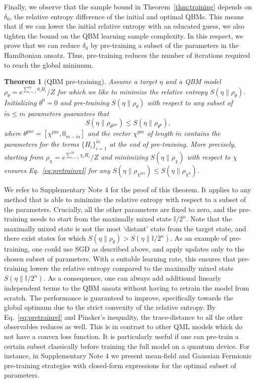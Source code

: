 \documentclass[
    reprint,
    aps,
    prx,
    longbibliography
]{revtex4-2}
\newtheorem{theorem}{Theorem}
\begin{document}
Finally, we observe that the sample bound in Theorem~\ref{thm:training} depends on $\delta_0$, the relative entropy difference of the initial and optimal QBMs. This means that if we can lower the initial relative entropy with an educated guess, we also tighten the bound on the QBM learning sample complexity. In this respect, we prove that we can reduce $\delta_0$ by pre-training a subset of the parameters in the Hamiltonian ansatz. Thus, pre-training reduces the number of iterations required to reach the global minimum.

\begin{theorem}[QBM pre-training]
\label{thm:pretraining}
    Assume a target $\eta$ and a QBM model $\rho_\theta=e^{\sum_{i=1}^m \theta_i H_i}/Z$ for which we like to minimize the relative entropy $S(\eta \|\rho_\theta)$. Initializing $\theta^0=0$ and pre-training $S(\eta\| \rho_\theta)$ with respect to any subset of $\tilde{m} \leq m $ parameters guarantees that \begin{equation}\label{eq:pretrainrel}
         S(\eta \|\rho_{\theta^\mathrm{pre}}) \leq S(\eta \|\rho_{\theta^0}), 
    \end{equation} where $\theta^\mathrm{pre} = [\chi^{\mathrm{pre}}, 0_{m-\tilde{m}}]$ and the vector $\chi^{\mathrm{pre}}$ of length $\tilde{m}$ contains the parameters for the terms $\{H_i\}_{i=1}^{\tilde{m}}$ at the end of pre-training.
    More precisely, starting from $\rho_\chi=e^{\sum_{i=1}^{\tilde{m}} \chi_i H_i}/Z$ and minimizing $S(\eta \|\rho_\chi)$ with respect to $\chi$ ensures Eq.~\eqref{eq:pretrainrel} for any $S(\eta \|\rho_{\chi^{\mathrm{pre}}})\leq S(\eta \|\rho_{\chi^0})$.
\end{theorem}

We refer to Supplementary Note 4 for the proof of this theorem. It applies to any method that is able to minimize the relative entropy with respect to a subset of the parameters. Crucially, all the other parameters are fixed to zero, and the pre-training needs to start from the maximally mixed state $\mathbb{I}/2^n$. Note that the maximally mixed state is not the most `distant' state from the target state, and there exist states for which $S(\eta \| \rho_\theta) > S(\eta \| \mathbb{I}/2^n)$. As an example of pre-training, one could use SGD as described above, and apply updates only to the chosen subset of parameters. With a suitable learning rate, this ensures that pre-training lowers the relative entropy compared to the maximally mixed state $S(\eta \|\mathbb{I}/2^n)$. As a consequence, one can always add additional linearly independent terms to the QBM ansatz without having to retrain the model from scratch. The performance is guaranteed to improve, specifically towards the global optimum due to the strict convexity of the relative entropy. By Eq.~\eqref{eq:pretrainrel} and Pinsker's inequality, the trace-distance to all the other observables reduces as well. This is in contrast to other QML models which do not have a convex loss function. It is particularly useful if one can pre-train a certain subset classically before training the full model on a quantum device. For instance, in Supplementary Note 4 we present mean-field and Gaussian Fermionic pre-training strategies with closed-form expressions for the optimal subset of parameters.
\end{document}
